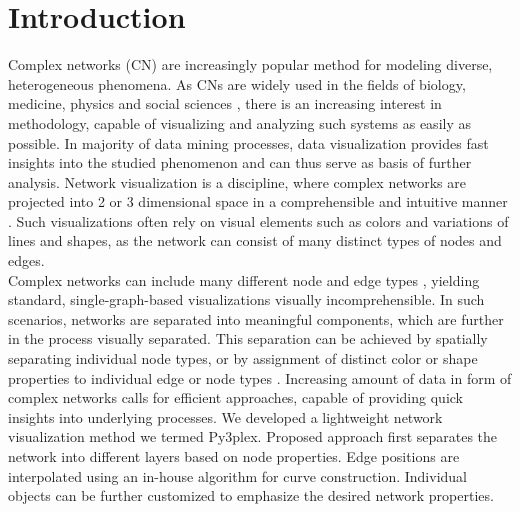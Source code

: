 \section{Introduction}
\label{intro}
Complex networks (CN) are increasingly popular method for modeling diverse, heterogeneous 
phenomena. As CNs are widely used in the fields of biology, medicine, physics and social 
sciences \cite{wang2002complex,nicosia2013growing}, there is an increasing interest in methodology, capable of visualizing and analyzing such systems as easily as possible. In majority of data mining processes, data visualization provides fast insights into the studied phenomenon and can thus serve as basis of further analysis. Network visualization is a discipline, where complex networks are projected into 2 or 3 dimensional space in a comprehensible and intuitive manner \cite{bach2017towards}. Such visualizations often rely on visual elements such as colors and variations of lines and shapes, as the network can consist of many distinct types of nodes and edges. \\
Complex networks can include many different node and edge types \cite{pilosof2017multilayer}, yielding standard, single-graph-based visualizations visually incomprehensible. In such scenarios, networks are separated into meaningful components, which are further in the process visually separated. This separation can be achieved by spatially separating individual node types, or by assignment of distinct color or shape properties to individual edge or node types \cite{hiveplots,de2014muxviz}. Increasing amount of data in form of complex networks calls for efficient approaches, capable of providing quick insights into underlying processes. We developed a lightweight network visualization method we termed Py3plex. Proposed approach first separates the network into different layers based on node properties. Edge positions are interpolated using an in-house algorithm for curve construction. Individual objects can be further customized to emphasize the desired network properties.

